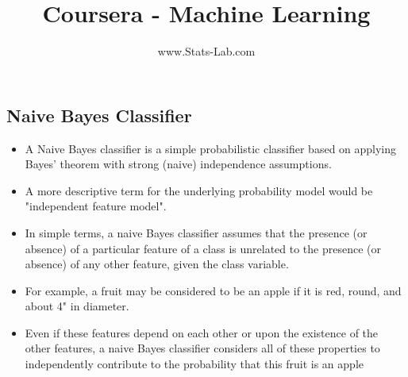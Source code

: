 \documentclass[12pt]{article}
\title{Coursera - Machine Learning}
\author{www.Stats-Lab.com}
\begin{document}
\maketitle


\subsection{Naive Bayes Classifier}


\begin{itemize}
\item A Naive Bayes classifier is a simple probabilistic classifier based on applying Bayes' theorem with strong (naive) independence assumptions.\item  A more descriptive term for the underlying probability model would be "independent feature model".
\item  In simple terms, a naive Bayes classifier assumes that the presence (or absence) of a particular feature of a class is unrelated to the presence (or absence) of any other feature, given the class variable. 
\item  For example, a fruit may be considered to be an apple if it is red, round, and about 4" in diameter. 
\item  Even if these features depend on each other or upon the existence of the other features, a naive Bayes classifier considers all of these properties to independently contribute to the probability that this fruit is an apple
\end{itemize}
\end{document}
